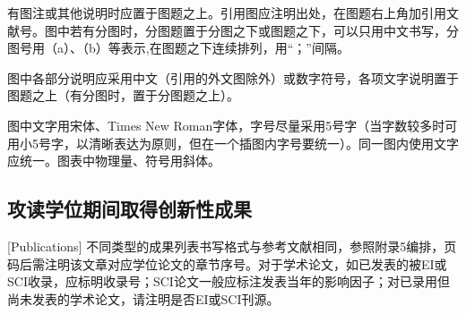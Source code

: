 有图注或其他说明时应置于图题之上。引用图应注明出处，在图题右上角加引用文献号。图中若有分图时，分图题置于分图之下或图题之下，可以只用中文书写，分图号用（a）、（b）等表示,在图题之下连续排列，用“；”间隔。

图中各部分说明应采用中文（引用的外文图除外）或数字符号，各项文字说明置于图题之上（有分图时，置于分图题之上）。

图中文字用宋体、Times New Roman字体，字号尽量采用5号字（当字数较多时可用小5号字，以清晰表达为原则，但在一个插图内字号要统一）。同一图内使用文字应统一。图表中物理量、符号用斜体。







\subsection{攻读学位期间取得创新性成果}[Publications]
不同类型的成果列表书写格式与参考文献相同，参照附录5编排，页码后需注明该文章对应学位论文的章节序号。对于学术论文，如已发表的被EI或SCI收录，应标明收录号；SCI论文一般应标注发表当年的影响因子；对已录用但尚未发表的学术论文，请注明是否EI或SCI刊源。



